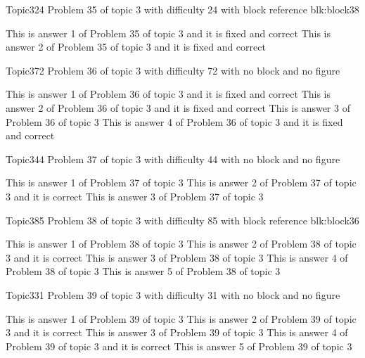 \documentclass[master]{exam}
\begin{document}
\begin{problem}[requires=blk:block38]{Topic3}{24}
	Problem 35 of topic 3 with difficulty 24 with block reference blk:block38
	\begin{answers}
		 This is answer 1 of Problem 35 of topic 3 and it is fixed and correct
		 This is answer 2 of Problem 35 of topic 3 and it is fixed and correct
	\end{answers}
\end{problem}

\begin{problem}{Topic3}{72}
	Problem 36 of topic 3 with difficulty 72 with no block and no figure
	\begin{answers}
		 This is answer 1 of Problem 36 of topic 3 and it is fixed and correct
		 This is answer 2 of Problem 36 of topic 3 and it is fixed and correct
		\answer This is answer 3 of Problem 36 of topic 3 
		 This is answer 4 of Problem 36 of topic 3 and it is fixed and correct
	\end{answers}
\end{problem}

\begin{problem}{Topic3}{44}
	Problem 37 of topic 3 with difficulty 44 with no block and no figure
	\begin{answers}
		\answer This is answer 1 of Problem 37 of topic 3 
		\answer[correct] This is answer 2 of Problem 37 of topic 3 and it is correct
		\answer This is answer 3 of Problem 37 of topic 3 
	\end{answers}
\end{problem}

\begin{problem}[requires=blk:block36]{Topic3}{85}
	Problem 38 of topic 3 with difficulty 85 with block reference blk:block36
	\begin{answers}
		\answer This is answer 1 of Problem 38 of topic 3 
		\answer[correct] This is answer 2 of Problem 38 of topic 3 and it is correct
		\answer This is answer 3 of Problem 38 of topic 3 
		\answer This is answer 4 of Problem 38 of topic 3 
		\answer This is answer 5 of Problem 38 of topic 3 
	\end{answers}
\end{problem}

\begin{problem}{Topic3}{31}
	Problem 39 of topic 3 with difficulty 31 with no block and no figure
	\begin{answers}
		\answer This is answer 1 of Problem 39 of topic 3 
		\answer[correct] This is answer 2 of Problem 39 of topic 3 and it is correct
		\answer This is answer 3 of Problem 39 of topic 3 
		\answer[correct] This is answer 4 of Problem 39 of topic 3 and it is correct
		\answer This is answer 5 of Problem 39 of topic 3 
	\end{answers}
\end{problem}
\end{document}
